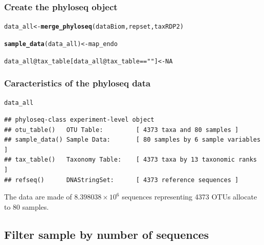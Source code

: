 \documentclass[12pt]{article}\usepackage[]{graphicx}\usepackage[]{color}
\makeatletter
\newcommand{\hlnum}[1]{\textcolor[rgb]{0.686,0.059,0.569}{#1}}%
\newcommand{\hlstr}[1]{\textcolor[rgb]{0.192,0.494,0.8}{#1}}%
\newcommand{\hlopt}[1]{\textcolor[rgb]{0,0,0}{#1}}%
\newcommand{\hlstd}[1]{\textcolor[rgb]{0.345,0.345,0.345}{#1}}%
\newcommand{\hlkwb}[1]{\textcolor[rgb]{0.69,0.353,0.396}{#1}}%
\newcommand{\hlkwc}[1]{\textcolor[rgb]{0.333,0.667,0.333}{#1}}%
\newcommand{\hlkwd}[1]{\textcolor[rgb]{0.737,0.353,0.396}{\textbf{#1}}}%
\newenvironment{kframe}{%
 \def\at@end@of@kframe{}%
 \ifinner\ifhmode%
  \def\at@end@of@kframe{\end{minipage}}%
  \begin{minipage}{\columnwidth}%
 \fi\fi%
 \def\FrameCommand##1{\hskip\@totalleftmargin \hskip-\fboxsep
 \colorbox{shadecolor}{##1}\hskip-\fboxsep
     \hskip-\linewidth \hskip-\@totalleftmargin \hskip\columnwidth}%
 \MakeFramed {\advance\hsize-\width
   \@totalleftmargin\z@ \linewidth\hsize
   \@setminipage}}%
 {\par\unskip\endMakeFramed%
 \at@end@of@kframe}
\newenvironment{knitrout}{}{} %
\numberwithin{figure}{section}
\makeatother
\begin{document}
 \subsubsection{Create the phyloseq object}

\begin{knitrout}\small
{}\color{fgcolor}\begin{kframe}
\begin{alltt}
\hlstd{data_all} \hlkwb{<-} \hlkwd{merge_phyloseq}\hlstd{(dataBiom, repset, taxRDP2)}

\hlkwd{sample_data}\hlstd{(data_all)} \hlkwb{<-} \hlstd{map_endo}

\hlstd{data_all}\hlopt{@}\hlkwc{tax_table}\hlstd{[data_all}\hlopt{@}\hlkwc{tax_table} \hlopt{==} \hlstr{""}\hlstd{]} \hlkwb{<-} \hlnum{NA}
\end{alltt}
\end{kframe}
\end{knitrout}

\subsubsection{Caracteristics of the phyloseq data}

\begin{knitrout}\small
{}\color{fgcolor}\begin{kframe}
\begin{alltt}
\hlstd{data_all}
\end{alltt}
\begin{verbatim}
## phyloseq-class experiment-level object
## otu_table()   OTU Table:         [ 4373 taxa and 80 samples ]
## sample_data() Sample Data:       [ 80 samples by 6 sample variables ]
## tax_table()   Taxonomy Table:    [ 4373 taxa by 13 taxonomic ranks ]
## refseq()      DNAStringSet:      [ 4373 reference sequences ]
\end{verbatim}
\end{kframe}
\end{knitrout}

The data are made of \ensuremath{8.398038\times 10^{6}} sequences representing 4373 OTUs allocate to 80 samples.

  \subsection{Filter sample by number of sequences}
\end{document}
